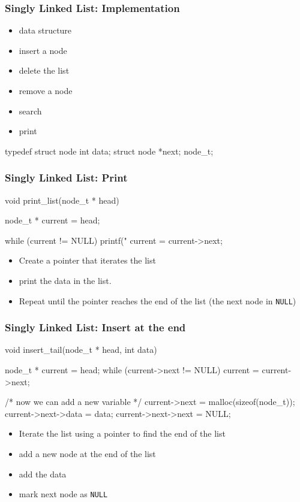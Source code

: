 \documentclass[newPxFont,sthlmFooter,nooffset]{beamer}
\begin{document}
\begin{frame}[t, fragile]
  \frametitle{Singly Linked List: Implementation}
  \begin{itemize}
  \item data structure
  \item insert a node
  \item delete the list
  \item remove a node
  \item search
  \item print
  \end{itemize}

  \begin{ncodedef}
typedef struct node {
    int data;
    struct node *next; 
} node_t;
  \end{ncodedef}  

\end{frame}


\begin{frame}[t, fragile]
  \frametitle{Singly Linked List: Print}
\begin{ncodedef}
void print_list(node_t * head) {
    node_t * current = head;

    while (current != NULL) {
        printf("%
        current = current->next;
    }
}  
\end{ncodedef}
\bigskip
  \begin{itemize}
  \item Create a pointer that iterates the list
  \item print the data in the list.
  \item Repeat until the pointer reaches the end of the list
    (the next node in \texttt{NULL})
  \end{itemize}

\end{frame}

\begin{frame}[t, fragile]
  \frametitle{Singly Linked List: Insert at the end}

  \begin{ncodedef}
void insert_tail(node_t * head, int data) {
    node_t * current = head;
    while (current->next != NULL) {
        current = current->next;
    }

    /* now we can add a new variable */
    current->next = malloc(sizeof(node_t));
    current->next->data = data;
    current->next->next = NULL;
}
  \end{ncodedef}  
\bigskip
  \begin{itemize}
  \item Iterate the list using a pointer to find the end of the list
  \item add a new node at the end of the list
  \item add the data
  \item mark next node as \texttt{NULL}
  \end{itemize}

\end{frame}
\end{document}
